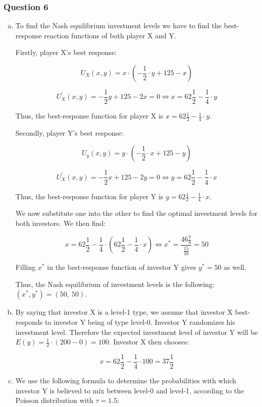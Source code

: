 \documentclass[a4paper]{article}
\begin{document}
\subsubsection{Question 6}
\begin{enumerate}[(a)]
\item
To find the Nash equilibrium investment levels we have to find the
best-response reaction functions of both player X and Y.


Firstly, player X's best response:


\[U_{X}\left( x,y \right) = x \cdot \left( - \frac{1}{2} \cdot y + 125 - x \right)\]

\[U_{X}^{'}\left( x,y \right) = - \frac{1}{2}y + 125 - 2x = 0 \Leftrightarrow x = 62\frac{1}{2} - \frac{1}{4} \cdot y\]

Thus, the best-response function for player X is
\(x = 62\frac{1}{2} - \frac{1}{4} \cdot y\).

Secondly, player Y's best response:

\[U_{y}\left( x,y \right) = y \cdot \left( - \frac{1}{2} \cdot x + 125 - y \right)\]

\[U_{X}^{'}\left( x,y \right) = - \frac{1}{2}x + 125 - 2y = 0 \Leftrightarrow y = 62\frac{1}{2} - \frac{1}{4} \cdot x\]

Thus, the best-response function for player Y is
\(y = 62\frac{1}{2} - \frac{1}{4} \cdot x\).

We now substitute one into the other to find the optimal investment
levels for both investors. We then find:

\[x = 62\frac{1}{2} - \frac{1}{4} \cdot \left( 62\frac{1}{2} - \frac{1}{4} \cdot x \right)\iff x^{*} = \frac{46\frac{7}{8}}{\frac{15}{16}} = 50\]

Filling \(x^{*}\) in the best-response function of investor Y gives
\(y^{*} = 50\) as well.

Thus, the Nash equilibrium of investment levels is the following:
\(\left( x^{*},y^{*} \right) = (50,\ 50)\).
\item
By saying that investor X is a level-1 type, we assume that investor
X best-responds to investor Y being of type level-0. Investor Y
randomizes his investment level. Therefore the expected investment level
of investor Y will be
\(E(y) = \frac{1}{2} \cdot \left( 200 - 0 \right) = 100\). Investor X
then chooses:

\[x = 62\frac{1}{2} - \frac{1}{4} \cdot 100 = 37\frac{1}{2}\]

\item
We use the following formula to determine the probabilities with
which investor Y is believed to mix between level-0 and level-1,
according to the Poisson distribution with \(\tau = 1.5\):


\end{enumerate}
\end{document}

